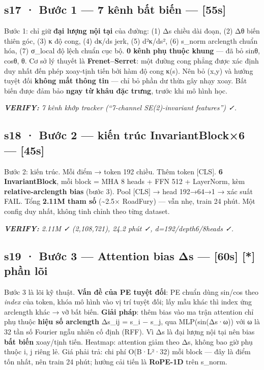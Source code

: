 \documentclass[
  11pt,
]{article}
\renewenvironment{quote}
  {\par\smallskip\noindent
   \def\FrameCommand{{\color{deckorange}\vrule width 2.5pt}\hspace{10pt}}%
   \MakeFramed{\advance\hsize-\width\FrameRestore}%
   \footnotesize\itshape\color{deckslate}}
  {\par\endMakeFramed\smallskip}
\begin{document}
\subsection{s17 · Bước 1 --- 7 kênh bất biến ---
{[}55s{]}}\label{s17-bux1b0ux1edbc-1-7-kuxeanh-bux1ea5t-biux1ebfn-55s}

Bước 1: chỉ giữ \textbf{đại lượng nội tại} của đường: (1) Δs chiều dài
đoạn, (2) \textbar Δθ\textbar{} biến thiên góc, (3) κ độ cong, (4) dκ/ds
jerk, (5) d²κ/ds², (6) s\_norm arclength chuẩn hóa, (7) σ\_local độ lệch
chuẩn cục bộ. \textbf{0 kênh phụ thuộc khung} --- đã bỏ sinθ, cosθ, θ.
Cơ sở lý thuyết là \textbf{Frenet--Serret}: một đường cong phẳng được
xác định duy nhất đến phép xoay-tịnh tiến bởi hàm độ cong κ(s). Nên bỏ
(x,y) và hướng tuyệt đối \textbf{không mất thông tin} --- chỉ bỏ phần dư
thừa gây nhạy xoay. Bất biến được đảm bảo \textbf{ngay từ khâu đặc
trưng}, trước khi mô hình học.

\begin{quote}
\textbf{VERIFY:} 7 kênh khớp tracker (``7-channel SE(2)-invariant
features'') ✓.
\end{quote}

\subsection{s18 · Bước 2 --- kiến trúc InvariantBlock×6 ---
{[}45s{]}}\label{s18-bux1b0ux1edbc-2-kiux1ebfn-truxfac-invariantblock6-45s}

Bước 2: kiến trúc. Mỗi điểm → token 192 chiều. Thêm token {[}CLS{]}.
\textbf{6 InvariantBlock}, mỗi block = MHA 8 heads + FFN 512 +
LayerNorm, kèm \textbf{relative-arclength bias} (bước 3). Pool {[}CLS{]}
→ head 192→64→1 → xác suất FAIL. Tổng \textbf{2.11M tham số}
(\textasciitilde2.5× RoadFury) --- vẫn nhẹ, train 24 phút. Một config
duy nhất, không tinh chỉnh theo từng dataset.

\begin{quote}
\textbf{VERIFY:} 2.11M ✓ (2,108,721), 24.2 phút ✓, d=192/depth6/8heads
✓.
\end{quote}

\subsection{s19 · Bước 3 --- Attention bias Δs --- {[}60s{]} {[}*{]}
phần
lõi}\label{s19-bux1b0ux1edbc-3-attention-bias-ux3b4s-60s-phux1ea7n-luxf5i}

Bước 3 là lõi kỹ thuật. \textbf{Vấn đề của PE tuyệt đối}: PE chuẩn dùng
sin/cos theo \emph{index} của token, khóa mô hình vào vị trí tuyệt đối;
lấy mẫu khác thì index ứng arclength khác → vỡ bất biến. \textbf{Giải
pháp}: thêm bias vào ma trận attention chỉ phụ thuộc \textbf{hiệu số
arclength} Δs\_ij = s\_i − s\_j, qua MLP(sin(Δs·ω)) với ω là 32 tần số
Fourier ngẫu nhiên cố định (RFF). Vì Δs là đại lượng nội tại nên bias
\textbf{bất biến} xoay/tịnh tiến. Heatmap: attention giảm theo
\textbar Δs\textbar, không bao giờ phụ thuộc i, j riêng lẻ. Giá phải
trả: chi phí O(B·L²·32) mỗi block --- đây là điểm tốn nhất, nên train 24
phút; hướng cải tiến là \textbf{RoPE-1D} trên s\_norm.
\end{document}
